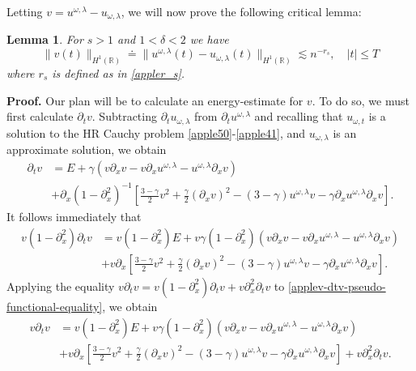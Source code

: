 \documentclass[12pt,reqno]{amsart}
\newcommand{\rr}{\mathbb{R}}
\newcommand{\p}{\partial}
\theoremstyle{plain}  %
\newtheorem{lemma}{Lemma}
\theoremstyle{definition}
\begin{document}
	
%
%
Letting $v = u^{\omega,\lambda} - u_{\omega,\lambda}$, we will now prove the following critical lemma:
\vskip0.2in
\begin{lemma}
	\label{applelem:bound_for_difference-of-approx-and-actual-soln}
	For $s > 1$ and $1<\delta<2$ we have 
			\begin{equation} 
				\|
				v(t)
				\|_{H^1(\rr)}
				\doteq
				\label{applediffer-H1-est} 
				\|
				u^{\omega,\lambda}(t) 
				- 
				u_{\omega,\lambda}(t)
				\|_{H^1(\rr)}
				\lesssim 
				n^{-r_s}, 
				\quad
				|t| \le T
			\end{equation}
			where $r_s$ is defined as in \eqref{appler_s}.
			\end{lemma}
			{\bf{Proof.}} Our plan will be to calculate an energy-estimate for $v$.
			To do so, we must first calculate $\p_t v$. Subtracting $\p_t
			u_{\omega, \lambda}$ from $\p_t u^{\omega,\lambda}$ and
			recalling that $u_{\omega,t}$ is a solution to the HR Cauchy
			problem \eqref{apple50}-\eqref{apple41},
			and $u_{\omega,\lambda}$ is an approximate solution, we obtain
			\begin{equation*}
				\begin{split}
					\p_t v 
					& = E + \gamma(v \p_x v - v \p_x u^{\omega,\lambda} - u^{\omega,\lambda} \p_x v) 
					\\
					& + \p_x \left( 1 - \p_x^2 \right)^{-1}  \left[ \frac{3-
					\gamma}{2}v^2 + \frac{\gamma}{2}\left( \p_x v \right)^2 - \left(
					3 - \gamma \right)u^{\omega,\lambda} v -
					\gamma \p_x u^{\omega,\lambda} \p_x v \right].
				\end{split}
			\end{equation*}
			It follows immediately that
		\begin{equation}
			\label{applev-dtv-pseudo-functional-equality}
			\begin{split}
			v(1-\p_x^2)\p_t v &= v(1- \p_x^2)E + v\gamma(1- \p_x^2)(v\p_x v 
			- v\p_x u^{\omega,\lambda} -
			u^{\omega,\lambda} \p_x v)
			\\
			&+ v\p_x \left[ \frac{3-\gamma}{2}v^2 + \frac{\gamma}{2}(\p_x v)^2 -
			(3-\gamma)u^{\omega,\lambda} v - \gamma \p_x u^{\omega,\lambda} \p_x v \right].
		\end{split}
	\end{equation}
	Applying the equality $v\p_t v = v(1-\p_x^2) \p_t v + v\p_x^2 \p_t v$ to
	\eqref{applev-dtv-pseudo-functional-equality}, we obtain
	\begin{equation*}
		\begin{split}
		v \p_t v &= v(1- \p_x^2)E + v\gamma(1- \p_x^2)(v\p_x v - v\p_x u^{\omega,\lambda} -
			u^{\omega,\lambda} \p_x v)
			\\
			&+ v\p_x \left[ \frac{3-\gamma}{2}v^2 + \frac{\gamma}{2}(\p_x v)^2 -
			(3-\gamma)u^{\omega,\lambda} v - \gamma \p_x u^{\omega,\lambda} \p_x v
			\right] + v\p_x^2 \p_t v.
		\end{split}
	\end{equation*}
\end{document}
